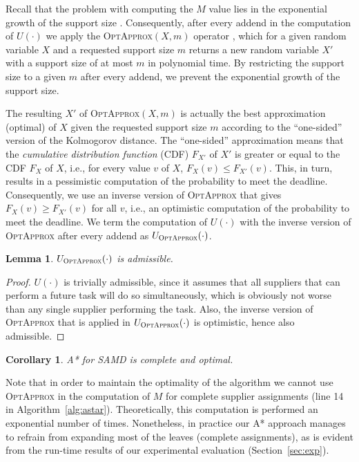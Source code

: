 \documentclass[letterpaper]{article} %
\newtheorem{corollary}{Corollary}
\newtheorem{lemma}{Lemma}
\newcommand{\samd}{\ac{SAMD}\xspace}
\newcommand{\astar}{\textsc{A*}\xspace}
\newcommand{\optapprox}{\textsc{OptApprox}\xspace}
\begin{document}
Recall that the problem with computing the $M$ value lies in the exponential growth of the support size \cite{cohen2015estimating}. Consequently, after every addend in the computation of $U(\cdot)$ we apply the \optapprox$(X,m)$ operator \cite{cohen2018optimal}, which for a given random variable $X$ and a requested support size $m$ returns a new random variable $X'$ with a support size of at most $m$ in polynomial time. By restricting the support size to a given $m$ after every addend, we prevent the exponential growth of the support size.

The resulting $X'$ of \optapprox$(X,m)$ is actually the best approximation (optimal) of $X$ given the requested support size $m$ according to the ``one-sided'' version of the Kolmogorov distance. The ``one-sided'' approximation means that the \emph{cumulative distribution function} (CDF) $F_{X'}$ of $X'$ is greater or equal to the CDF $F_{X}$ of $X$, i.e., for every value $v$ of $X$, $F_{X}(v)\leq F_{X'}(v)$. This, in turn, results in a pessimistic computation of the probability to meet the deadline. Consequently, we use an inverse version of \optapprox that gives $F_{X}(v)\geq F_{X'}(v)$ for all $v$, i.e., an optimistic computation of the probability to meet the deadline. We term the computation of $U(\cdot)$ with the inverse version of \optapprox after every addend as $U_{\optapprox}(\cdot)$.

\begin{lemma}
$U_{\optapprox}(\cdot)$ is admissible.
\label{lem:admissible}
\end{lemma}

\begin{proof}
$U(\cdot)$ is trivially admissible, since it assumes that all suppliers that can perform a future task will do so simultaneously, which is obviously not worse than any single supplier performing the task. Also, the inverse version of \optapprox that is applied in $U_{\optapprox}(\cdot)$ is optimistic, hence also admissible.
\end{proof}

\begin{corollary}
\astar for \samd is complete and optimal.
\end{corollary}

Note that in order to maintain the optimality of the algorithm we cannot use \optapprox in the computation of $M$ for complete supplier assignments (line 14 in Algorithm~\ref{alg:astar}). Theoretically, this computation is performed an exponential number of times. Nonetheless, in practice our \astar approach manages to refrain from expanding most of the leaves (complete assignments), as is evident from the run-time results of our experimental evaluation (Section~\ref{sec:exp}).
\end{document}
